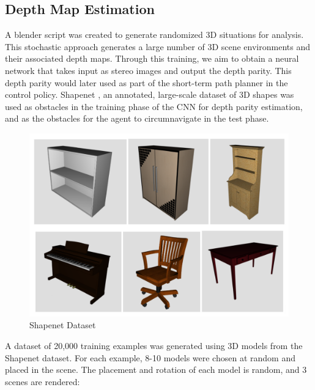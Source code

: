 \subsection{Depth Map Estimation}
A blender script was created to generate randomized 3D situations for analysis. This stochastic approach generates a large number of 3D scene environments and their associated depth maps.
Through this training, we aim to obtain a neural network that takes input as stereo images and output the depth parity. This depth parity would later used as part of the short-term path planner in the control policy.
Shapenet \cite{shapenet2015}, an annotated, large-scale dataset of 3D shapes was used as obstacles in the training phase of the CNN for depth parity estimation, and as the obstacles for the agent to circumnavigate in the test phase.

\begin{figure}
  \includegraphics[width=\linewidth]{images/shapenet.png}
  \caption{Shapenet Dataset}
  \label{fig:boat1}
\end{figure}

A dataset of 20,000 training examples was generated using 3D models from the Shapenet dataset. For each example, 8-10 models were chosen at random and placed in the scene.
The placement and rotation of each model is random, and 3 scenes are rendered:

